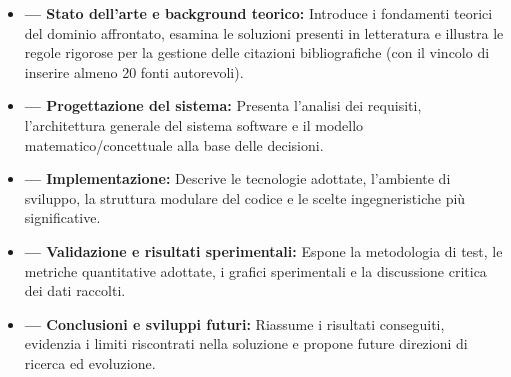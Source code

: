 \begin{itemize}
    \item \textbf{ --- Stato dell'arte e background teorico:} Introduce i fondamenti teorici del dominio affrontato, esamina le soluzioni presenti in letteratura e illustra le regole rigorose per la gestione delle citazioni bibliografiche (con il vincolo di inserire almeno 20 fonti autorevoli).
    \item \textbf{ --- Progettazione del sistema:} Presenta l'analisi dei requisiti, l'architettura generale del sistema software e il modello matematico/concettuale alla base delle decisioni.
    \item \textbf{ --- Implementazione:} Descrive le tecnologie adottate, l'ambiente di sviluppo, la struttura modulare del codice e le scelte ingegneristiche più significative.
    \item \textbf{ --- Validazione e risultati sperimentali:} Espone la metodologia di test, le metriche quantitative adottate, i grafici sperimentali e la discussione critica dei dati raccolti.
    \item \textbf{ --- Conclusioni e sviluppi futuri:} Riassume i risultati conseguiti, evidenzia i limiti riscontrati nella soluzione e propone future direzioni di ricerca ed evoluzione.
\end{itemize}